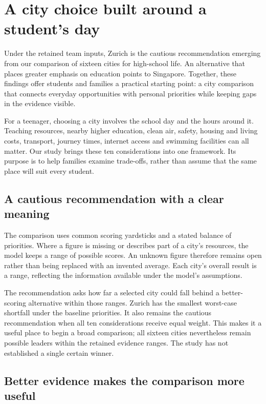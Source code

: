 \section*{A city choice built around a student's day}

Under the retained team inputs, Zurich is the cautious recommendation emerging from our comparison of sixteen cities for high-school life. An alternative that places greater emphasis on education points to Singapore. Together, these findings offer students and families a practical starting point: a city comparison that connects everyday opportunities with personal priorities while keeping gaps in the evidence visible.

For a teenager, choosing a city involves the school day and the hours around it. Teaching resources, nearby higher education, clean air, safety, housing and living costs, transport, journey times, internet access and swimming facilities can all matter. Our study brings these ten considerations into one framework. Its purpose is to help families examine trade-offs, rather than assume that the same place will suit every student.

\subsection*{A cautious recommendation with a clear meaning}

The comparison uses common scoring yardsticks and a stated balance of priorities. Where a figure is missing or describes part of a city's resources, the model keeps a range of possible scores. An unknown figure therefore remains open rather than being replaced with an invented average. Each city's overall result is a range, reflecting the information available under the model's assumptions.

The recommendation asks how far a selected city could fall behind a better-scoring alternative within those ranges. Zurich has the smallest worst-case shortfall under the baseline priorities. It also remains the cautious recommendation when all ten considerations receive equal weight. This makes it a useful place to begin a broad comparison; all sixteen cities nevertheless remain possible leaders within the retained evidence ranges. The study has not established a single certain winner.

\subsection*{Better evidence makes the comparison more useful}

